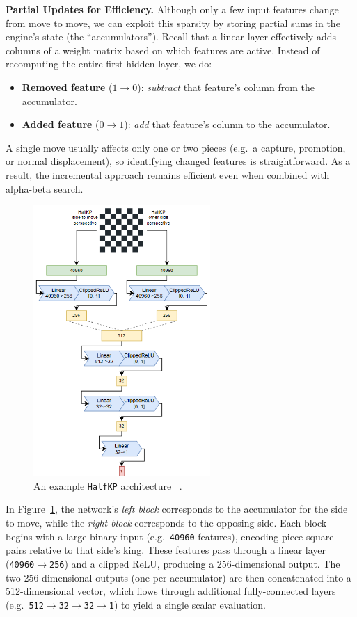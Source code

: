 \documentclass[12pt,a4paper]{article}
\begin{document}
\medskip

\noindent
\textbf{Partial Updates for Efficiency.} Although only a few input features change from move to move, we can exploit this sparsity by storing partial sums in the engine’s state (the “accumulators”). Recall that a linear layer effectively adds columns of a weight matrix based on which features are active. Instead of recomputing the entire first hidden layer, we do:
\begin{itemize}
    \item \textbf{Removed feature} (\(1 \to 0\)): \quad \emph{subtract} that feature’s column from the accumulator.
    \item \textbf{Added feature}  (\(0 \to 1\)): \quad \emph{add} that feature’s column to the accumulator.
\end{itemize}
A single move usually affects only one or two pieces (e.g.\ a capture, promotion, or normal displacement), so identifying changed features is straightforward. As a result, the incremental approach remains efficient even when combined with alpha-beta search.

\begin{figure}[H]
    \centering
    \includegraphics[width=0.6\textwidth]{figures/sfnn.png}
    \caption{An example \texttt{HalfKP} architecture ~\cite{githubdocs}.}
    \label{fig:halfkp_arch}
\end{figure}

\noindent  
In Figure~\ref{fig:halfkp_arch}, the network’s \emph{left block} corresponds to the accumulator for the side to move, while the \emph{right block} corresponds to the opposing side. Each block begins with a large binary input (e.g.\ \texttt{40960} features), encoding piece-square pairs relative to that side’s king. These features pass through a linear layer (\texttt{40960$\to$256}) and a clipped ReLU, producing a 256-dimensional output. The two 256-dimensional outputs (one per accumulator) are then concatenated into a 512-dimensional vector, which flows through additional fully-connected layers (e.g.\ \texttt{512$\to$32$\to$32$\to$1}) to yield a single scalar evaluation.
\end{document}
